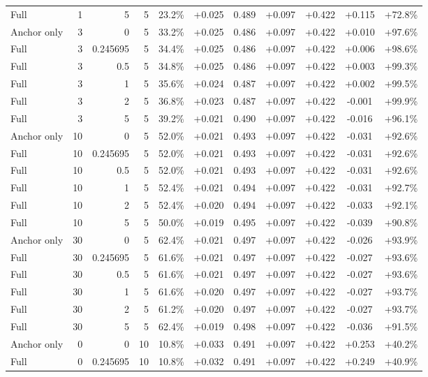 \begin{table}[htbp]
\begin{tabular}{lrrrccccccc}
Full & 1 & 5 & 5 & 23.2\% & +0.025 & 0.489 & +0.097 & +0.422 & +0.115 & +72.8\% \\
Anchor only & 3 & 0 & 5 & 33.2\% & +0.025 & 0.486 & +0.097 & +0.422 & +0.010 & +97.6\% \\
Full & 3 & 0.245695 & 5 & 34.4\% & +0.025 & 0.486 & +0.097 & +0.422 & +0.006 & +98.6\% \\
Full & 3 & 0.5 & 5 & 34.8\% & +0.025 & 0.486 & +0.097 & +0.422 & +0.003 & +99.3\% \\
Full & 3 & 1 & 5 & 35.6\% & +0.024 & 0.487 & +0.097 & +0.422 & +0.002 & +99.5\% \\
Full & 3 & 2 & 5 & 36.8\% & +0.023 & 0.487 & +0.097 & +0.422 & -0.001 & +99.9\% \\
Full & 3 & 5 & 5 & 39.2\% & +0.021 & 0.490 & +0.097 & +0.422 & -0.016 & +96.1\% \\
Anchor only & 10 & 0 & 5 & 52.0\% & +0.021 & 0.493 & +0.097 & +0.422 & -0.031 & +92.6\% \\
Full & 10 & 0.245695 & 5 & 52.0\% & +0.021 & 0.493 & +0.097 & +0.422 & -0.031 & +92.6\% \\
Full & 10 & 0.5 & 5 & 52.0\% & +0.021 & 0.493 & +0.097 & +0.422 & -0.031 & +92.6\% \\
Full & 10 & 1 & 5 & 52.4\% & +0.021 & 0.494 & +0.097 & +0.422 & -0.031 & +92.7\% \\
Full & 10 & 2 & 5 & 52.4\% & +0.020 & 0.494 & +0.097 & +0.422 & -0.033 & +92.1\% \\
Full & 10 & 5 & 5 & 50.0\% & +0.019 & 0.495 & +0.097 & +0.422 & -0.039 & +90.8\% \\
Anchor only & 30 & 0 & 5 & 62.4\% & +0.021 & 0.497 & +0.097 & +0.422 & -0.026 & +93.9\% \\
Full & 30 & 0.245695 & 5 & 61.6\% & +0.021 & 0.497 & +0.097 & +0.422 & -0.027 & +93.6\% \\
Full & 30 & 0.5 & 5 & 61.6\% & +0.021 & 0.497 & +0.097 & +0.422 & -0.027 & +93.6\% \\
Full & 30 & 1 & 5 & 61.6\% & +0.020 & 0.497 & +0.097 & +0.422 & -0.027 & +93.7\% \\
Full & 30 & 2 & 5 & 61.2\% & +0.020 & 0.497 & +0.097 & +0.422 & -0.027 & +93.7\% \\
Full & 30 & 5 & 5 & 62.4\% & +0.019 & 0.498 & +0.097 & +0.422 & -0.036 & +91.5\% \\
Anchor only & 0 & 0 & 10 & 10.8\% & +0.033 & 0.491 & +0.097 & +0.422 & +0.253 & +40.2\% \\
Full & 0 & 0.245695 & 10 & 10.8\% & +0.032 & 0.491 & +0.097 & +0.422 & +0.249 & +40.9\% \\

\end{tabular}
\end{table}
